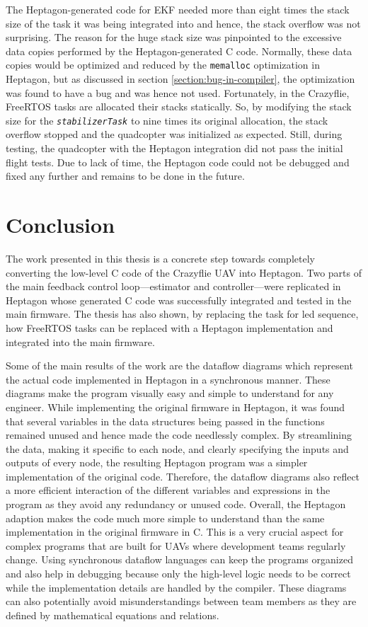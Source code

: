 \documentclass[10pt, a4paper]{article}
\newcommand{\textFunc}[1]{\texttt{\textit{#1}}}
\newcommand{\code}[1]{\texttt{#1}}
\begin{document}
    The Heptagon-generated code for EKF needed more than eight times the stack size of the task it was being integrated into and hence, the stack overflow was not surprising. The reason for the huge stack size was pinpointed to the excessive data copies performed by the Heptagon-generated C code. Normally, these data copies would be optimized and reduced by the \code{memalloc} optimization in Heptagon, but as discussed in section \ref{section:bug-in-compiler}, the optimization was found to have a bug and was hence not used. Fortunately, in the Crazyflie, FreeRTOS tasks are allocated their stacks statically. So, by modifying the stack size for the \textFunc{stabilizerTask} to nine times its original allocation, the stack overflow stopped and the quadcopter was initialized as expected. Still, during testing, the quadcopter with the Heptagon integration did not pass the initial flight tests. Due to lack of time, the Heptagon code could not be debugged and fixed any further and remains to be done in the future.

\section{Conclusion}
    The work presented in this thesis is a concrete step towards completely converting the low-level C code of the Crazyflie UAV into Heptagon. Two parts of the main feedback control loop---estimator and controller---were replicated in Heptagon whose generated C code was successfully integrated and tested in the main firmware. The thesis has also shown, by replacing the task for led sequence, how FreeRTOS tasks can be replaced with a Heptagon implementation and integrated into the main firmware.

    Some of the main results of the work are the dataflow diagrams which represent the actual code implemented in Heptagon in a synchronous manner. These diagrams make the program visually easy and simple to understand for any engineer. While implementing the original firmware in Heptagon, it was found that several variables in the data structures being passed in the functions remained unused and hence made the code needlessly complex. By streamlining the data, making it specific to each node, and clearly specifying the inputs and outputs of every node, the resulting Heptagon program was a simpler implementation of the original code. Therefore, the dataflow diagrams also reflect a more efficient interaction of the different variables and expressions in the program as they avoid any redundancy or unused code. Overall, the Heptagon adaption makes the code much more simple to understand than the same implementation in the original firmware in C. This is a very crucial aspect for complex programs that are built for UAVs where development teams regularly change. Using synchronous dataflow languages can keep the programs organized and also help in debugging because only the high-level logic needs to be correct while the implementation details are handled by the compiler. These diagrams can also potentially avoid misunderstandings between team members as they are defined by mathematical equations and relations.
\end{document}
